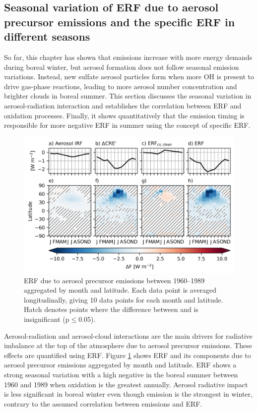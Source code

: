 \subsection{Seasonal variation of ERF due to aerosol precursor emissions and the specific ERF in different seasons}

So far, this chapter has shown that  emissions increase with more energy demands during boreal winter, but aerosol formation does not follow seasonal emission variations. Instead, new sulfate aerosol particles form when more OH is present to drive gas-phase reactions, leading to more aerosol number concentration and brighter clouds in boreal summer. This section discusses the seasonal variation in aerosol-radiation interaction and establishes the correlation between ERF and oxidation processes. Finally, it shows quantitatively that the emission timing is responsible for more negative ERF in summer using the concept of specific ERF.


\begin{figure}
    \centering
    \includegraphics{Chapter4/Figs/latitudinal_erf_sstpiaer-histsst_pothole.png}
    \caption[ERF due to aerosol precursor emissions between 1960--1989 aggregated by month and latitude]{ERF due to aerosol precursor emissions between 1960--1989 aggregated by month and latitude. Each data point is averaged longitudinally, giving 10 data points for each month and latitude. Hatch denotes points where the difference between \histsst{} and \sstpiaer{} is insignificant (p$\leq$0.05).}
    \label{fig:ch4:seasonal-erf}
\end{figure}

Aerosol-radiation and aerosol-cloud interactions are the main drivers for radiative imbalance at the top of the atmosphere due to aerosol precursor emissions. These effects are quantified using ERF. Figure \ref{fig:ch4:seasonal-erf} shows ERF and its components due to aerosol precursor emissions aggregated by month and latitude. ERF shows a strong seasonal variation with a high negative in the boreal summer between 1960 and 1989 when  oxidation is the greatest annually. Aerosol radiative impact is less significant in boreal winter even though  emission is the strongest in winter, contrary to the assumed correlation between emissions and ERF. 

